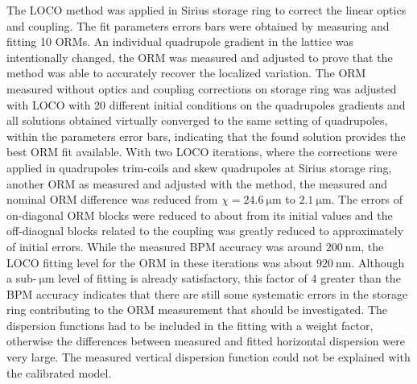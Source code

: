     The LOCO method was applied in Sirius storage ring to correct the linear optics and coupling. The fit parameters errors bars were obtained by measuring and fitting 10 ORMs. An individual quadrupole gradient in the lattice was intentionally changed, the ORM was measured and adjusted to prove that the method was able to accurately recover the localized variation. The ORM measured without optics and coupling corrections on storage ring was adjusted with LOCO with 20 different initial conditions on the quadrupoles gradients and all solutions obtained virtually converged to the same setting of quadrupoles, within the parameters error bars, indicating that the found solution provides the best ORM fit available. With two LOCO iterations, where the corrections were applied in quadrupoles trim-coils and skew quadrupoles at Sirius storage ring, another ORM as measured and adjusted with the method, the measured and nominal ORM difference was reduced from $\chi = \SI{24.6}{\micro\meter}$ to $\SI{2.1}{\micro\meter}$. The errors of on-diagonal ORM blocks were reduced to about  from its initial values and the off-diaognal blocks related to the coupling was greatly reduced to approximately  of initial errors. While the measured BPM accuracy was around $\SI{200}{\nano\meter}$, the LOCO fitting level for the ORM in these iterations was about $\SI{920}{\nano\meter}$. Although a sub-$\SI{}{\micro\meter}$ level of fitting is already satisfactory, this factor of 4 greater than the BPM accuracy indicates that there are still some systematic errors in the storage ring contributing to the ORM measurement that should be investigated. The dispersion functions had to be included in the fitting with a weight factor, otherwise the differences between measured and fitted horizontal dispersion were very large. The measured vertical dispersion function could not be explained with the calibrated model. 
    
